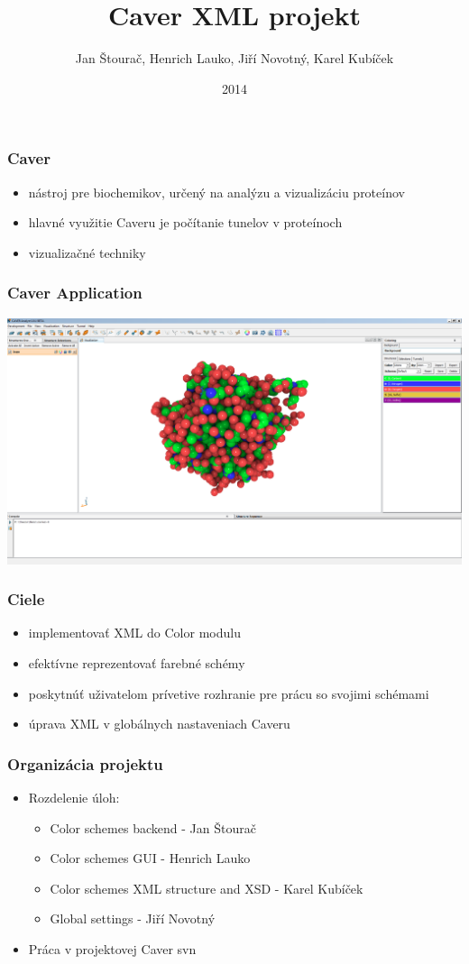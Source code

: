 \documentclass[slovak]{beamer}
\title{Caver XML projekt}
\date{2014}
\author{
	Jan Štourač, Henrich Lauko, Jiří Novotný, Karel Kubíček
}
\begin{document}
\begin{frame}
	\titlepage
\end{frame}

\begin{frame}
\frametitle{Caver}
	\begin{itemize}
		\item nástroj pre biochemikov, určený na analýzu a vizualizáciu proteínov
		\item hlavné využitie Caveru je počítanie tunelov v proteínoch
		\item vizualizačné techniky
	\end{itemize}
\end{frame}

\begin{frame}
\frametitle{Caver Application}
	\begin{center}
		\includegraphics[width=\linewidth]{caver.png}
	\end{center}
\end{frame}



\begin{frame}
\frametitle{Ciele}
	\begin{itemize}
		\item implementovať XML do Color modulu
		\item efektívne reprezentovať farebné schémy
		\item poskytnúť uživatelom prívetive rozhranie pre prácu so svojimi schémami 
		\item úprava XML v globálnych nastaveniach Caveru
	\end{itemize}
\end{frame}

\begin{frame}
\frametitle{Organizácia projektu}
	\begin{itemize}
		\item Rozdelenie úloh:
		\begin{itemize}
			\item Color schemes backend - Jan Štourač
			\item Color schemes GUI - Henrich Lauko
			\item Color schemes XML structure and XSD - Karel Kubíček
			\item Global settings - Jiří Novotný
		\end{itemize}
		\item Práca v projektovej Caver svn
	\end{itemize}
\end{frame}
\end{document}
